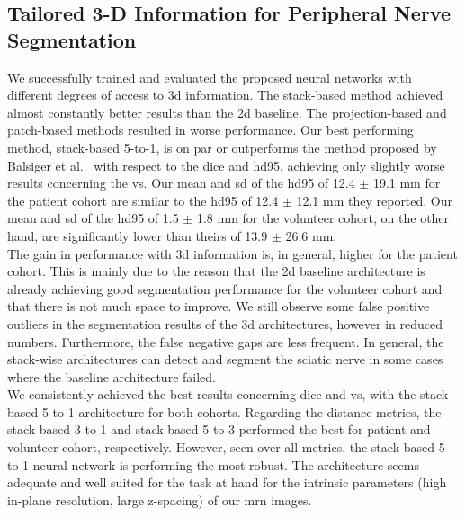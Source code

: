 \subsection{Tailored 3-D Information for Peripheral Nerve Segmentation}
We successfully trained and evaluated the proposed neural networks with different degrees of access to \gls{3d} information. The stack-based method achieved almost constantly better results than the \gls{2d} baseline. The projection-based and patch-based methods resulted in worse performance. Our best performing method, stack-based 5-to-1, is on par or outperforms the method proposed by Balsiger et al.~\cite{Balsiger2018SegmentationApproach} with respect to the \acrlong{dice} and \acrlong{hd95}, achieving only slightly worse results concerning the \acrlong{vs}. Our mean and \gls{sd} of the \gls{hd95} of 12.4 $\pm$ 19.1 mm for the patient cohort are similar to the \gls{hd95} of 12.4 $\pm$ 12.1 mm they reported. Our mean and \gls{sd} of the \gls{hd95} of 1.5 $\pm$ 1.8 mm for the volunteer cohort, on the other hand, are significantly lower than theirs of 13.9 $\pm$ 26.6 mm.\\
The gain in performance with \gls{3d} information is, in general, higher for the patient cohort. This is mainly due to the reason that the \gls{2d} baseline architecture is already achieving good segmentation performance for the volunteer cohort and that there is not much space to improve. We still observe some false positive outliers in the segmentation results of the \gls{3d} architectures, however in reduced numbers. Furthermore, the false negative gaps are less frequent. In general, the stack-wise architectures can detect and segment the sciatic nerve in some cases where the baseline architecture failed.\\
We consistently achieved the best results concerning \acrlong{dice} and \acrlong{vs}, with the stack-based 5-to-1 architecture for both cohorts. Regarding the distance-metrics, the stack-based 3-to-1 and stack-based 5-to-3 performed the best for patient and volunteer cohort, respectively. However, seen over all metrics, the stack-based 5-to-1 neural network is performing the most robust. The architecture seems adequate and well suited for the task at hand for the intrinsic parameters (high in-plane resolution, large z-spacing) of our \gls{mrn} images.

